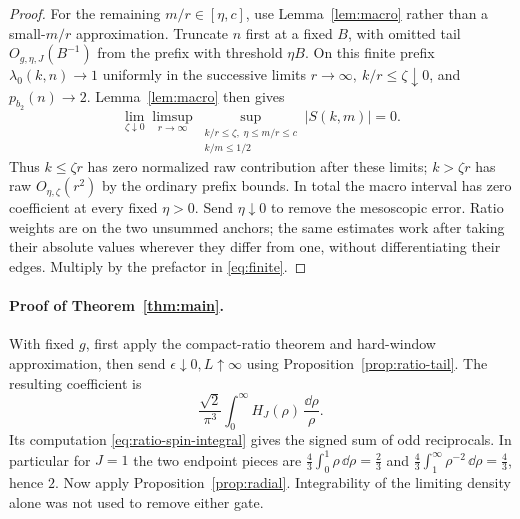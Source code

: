 \begin{proof}
For the remaining \(m/r\in[\eta,c]\), use Lemma~\ref{lem:macro} rather than a small-\(m/r\) approximation. Truncate \(n\) first at a fixed \(B\), with omitted tail \(O_{g,\eta,J}(B^{-1})\) from the prefix with threshold \(\eta B\). On this finite prefix \(\lambda_0(k,n)\to1\) uniformly in the successive limits \(r\to\infty,\ k/r\le\zeta\downarrow0\), and \(p_{b_2}(n)\to2\). Lemma~\ref{lem:macro} then gives
\[
 \lim_{\zeta\downarrow0}\limsup_{r\to\infty}
 \sup_{\substack{k/r\le\zeta,\;\eta\le m/r\le c\\ k/m\le1/2}}
 |S(k,m)|=0 .
\]
Thus \(k\le\zeta r\) has zero normalized raw contribution after these limits; \(k>\zeta r\) has raw \(O_{\eta,\zeta}(r^2)\) by the ordinary prefix bounds. In total the macro interval has zero coefficient at every fixed \(\eta>0\). Send \(\eta\downarrow0\) to remove the mesoscopic error. Ratio weights are on the two unsummed anchors; the same estimates work after taking their absolute values wherever they differ from one, without differentiating their edges. Multiply by the prefactor in \eqref{eq:finite}.
\end{proof}

\paragraph{Proof of Theorem~\ref{thm:main}.}
With fixed \(g\), first apply the compact-ratio theorem and hard-window approximation, then send \(\epsilon\downarrow0,L\uparrow\infty\) using Proposition~\ref{prop:ratio-tail}. The resulting coefficient is
\[\frac{\sqrt2}{\pi^3}\int_0^\infty H_J(\rho)\,\frac{\dd\rho}{\rho}.\] Its computation \eqref{eq:ratio-spin-integral} gives the signed sum of odd reciprocals. In particular for \(J=1\) the two endpoint pieces are \(\frac43\int_0^1\rho\,\dd\rho=\frac23\) and \(\frac43\int_1^\infty\rho^{-2}\,\dd\rho=\frac43\), hence \(2\). Now apply Proposition~\ref{prop:radial}. Integrability of the limiting density alone was not used to remove either gate.
